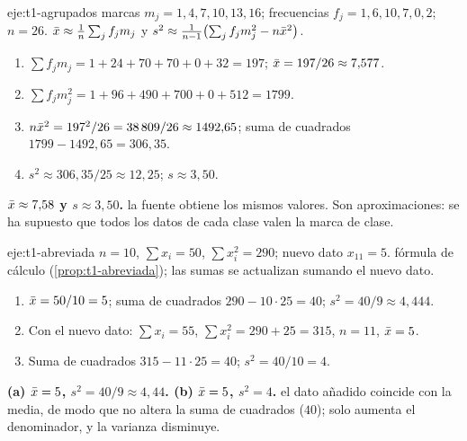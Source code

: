 \begin{solucion}{eje:t1-agrupados}
\datos marcas $m_j=1,4,7,10,13,16$; frecuencias $f_j=1,6,10,7,0,2$; $n=26$.
\planteamiento $\bar{x}\approx\frac1n\sum_j f_jm_j$ y $s^{2}\approx\frac{1}{n-1}\bigl(\sum_j f_jm_j^{2}-n\bar{x}^{2}\bigr)$.
\pasos
\begin{enumerate}[label=\arabic*.]
  \item $\sum f_jm_j=1+24+70+70+0+32=197$; $\bar{x}=197/26\approx7{,}577$.
  \item $\sum f_jm_j^{2}=1+96+490+700+0+512=1799$.
  \item $n\bar{x}^{2}=197^{2}/26=38\,809/26\approx1492{,}65$; suma de cuadrados $1799-1492{,}65=306{,}35$.
  \item $s^{2}\approx306{,}35/25\approx12{,}25$; $s\approx3{,}50$.
\end{enumerate}
\resultado \textbf{$\bar{x}\approx7{,}58$ y $s\approx3{,}50$.}
\comprobacion la fuente obtiene los mismos valores. Son aproximaciones: se ha supuesto que todos los datos de cada clase valen la marca de clase.
\end{solucion}

\begin{solucion}{eje:t1-abreviada}
\datos $n=10$, $\sum x_i=50$, $\sum x_i^{2}=290$; nuevo dato $x_{11}=5$.
\planteamiento fórmula de cálculo (\cref{prop:t1-abreviada}); las sumas se actualizan sumando el nuevo dato.
\pasos
\begin{enumerate}[label=\arabic*.]
  \item $\bar{x}=50/10=5$; suma de cuadrados $290-10\cdot25=40$; $s^{2}=40/9\approx4{,}444$.
  \item Con el nuevo dato: $\sum x_i=55$, $\sum x_i^{2}=290+25=315$, $n=11$, $\bar{x}=5$.
  \item Suma de cuadrados $315-11\cdot25=40$; $s^{2}=40/10=4$.
\end{enumerate}
\resultado \textbf{(a) $\bar{x}=5$, $s^{2}=40/9\approx4{,}44$. (b) $\bar{x}=5$, $s^{2}=4$.}
\comprobacion el dato añadido coincide con la media, de modo que no altera la suma de cuadrados ($40$); solo aumenta el denominador, y la varianza disminuye.
\end{solucion}

